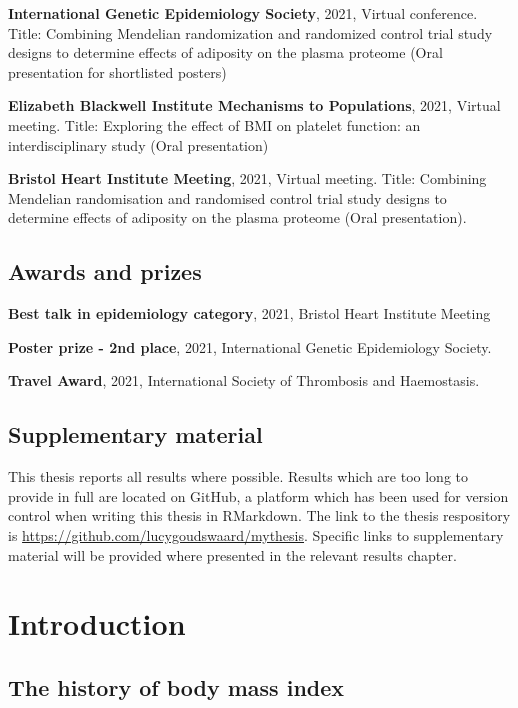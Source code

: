 \documentclass[11pt,twoside]{bristolthesis}
\begin{document}
\textbf{International Genetic Epidemiology Society}, 2021, Virtual conference. Title: Combining Mendelian randomization and randomized control trial study designs to determine effects of adiposity on the plasma proteome (Oral presentation for shortlisted posters)

\textbf{Elizabeth Blackwell Institute Mechanisms to Populations}, 2021, Virtual meeting. Title: Exploring the effect of BMI on platelet function: an interdisciplinary study (Oral presentation)

\textbf{Bristol Heart Institute Meeting}, 2021, Virtual meeting. Title: Combining Mendelian randomisation and randomised control trial study designs to determine effects of adiposity on the plasma proteome (Oral presentation).

\hypertarget{awards-and-prizes}{%
\section{Awards and prizes}\label{awards-and-prizes}}

\textbf{Best talk in epidemiology category}, 2021, Bristol Heart Institute Meeting

\textbf{Poster prize - 2nd place}, 2021, International Genetic Epidemiology Society.

\textbf{Travel Award}, 2021, International Society of Thrombosis and Haemostasis.

\hypertarget{supplementary-material}{%
\section{Supplementary material}\label{supplementary-material}}

This thesis reports all results where possible. Results which are too long to provide in full are located on GitHub, a platform which has been used for version control when writing this thesis in RMarkdown. The link to the thesis respository is \url{https://github.com/lucygoudswaard/mythesis}. Specific links to supplementary material will be provided where presented in the relevant results chapter.

\hypertarget{background}{%
\chapter{Introduction}\label{background}}

\hypertarget{the-history-of-body-mass-index}{%
\section{The history of body mass index}\label{the-history-of-body-mass-index}}
\end{document}
